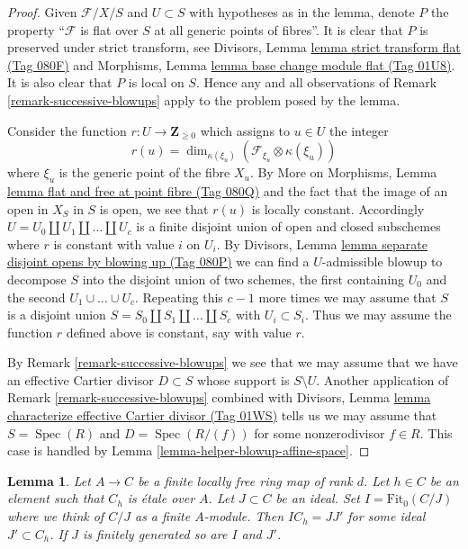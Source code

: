 \documentclass{amsart}
\theoremstyle{plain}
\newtheorem{lemma}[subsection]{Lemma}
\theoremstyle{definition}
\theoremstyle{remark}
\numberwithin{equation}{subsection}
\def\Spec{\mathop{\mathrm{Spec}}}
\begin{document}
\begin{proof}
Given $\mathcal{F}/X/S$ and $U \subset S$ with hypotheses as
in the lemma, denote $P$ the property ``$\mathcal{F}$ is flat over $S$ at
all generic points of fibres''. It is clear that $P$ is preserved under
strict transform, see
Divisors, Lemma \href{https://stacks.math.columbia.edu/tag/080F}{lemma strict transform flat (Tag 080F)}
and Morphisms, Lemma \href{https://stacks.math.columbia.edu/tag/01U8}{lemma base change module flat (Tag 01U8)}.
It is also clear that $P$ is local on $S$. Hence any and all observations
of Remark \ref{remark-successive-blowups} apply to the problem posed by
the lemma.

\medskip\noindent
Consider the function $r : U \to \mathbf{Z}_{\geq 0}$ which assigns to
$u \in U$ the integer
$$
r(u) = \dim_{\kappa(\xi_u)}(\mathcal{F}_{\xi_u} \otimes \kappa(\xi_u))
$$
where $\xi_u$ is the generic point of the fibre $X_u$.
By More on Morphisms, Lemma
\href{https://stacks.math.columbia.edu/tag/080Q}{lemma flat and free at point fibre (Tag 080Q)}
and the fact that the image of an open in $X_S$ in $S$ is open,
we see that $r(u)$ is locally constant. Accordingly
$U = U_0 \amalg U_1 \amalg \ldots \amalg U_c$ is a finite disjoint
union of open and closed subschemes where $r$ is constant with value
$i$ on $U_i$. By
Divisors, Lemma \href{https://stacks.math.columbia.edu/tag/080P}{lemma separate disjoint opens by blowing up (Tag 080P)}
we can find a $U$-admissible blowup to decompose $S$ into
the disjoint union of two schemes, the first containing $U_0$ and
the second $U_1 \cup \ldots \cup U_c$. Repeating this $c - 1$
more times we may assume that $S$ is a disjoint union
$S = S_0 \amalg S_1 \amalg \ldots \amalg S_c$ with $U_i \subset S_i$.
Thus we may assume the function $r$ defined above is constant, say
with value $r$.

\medskip\noindent
By Remark \ref{remark-successive-blowups} we see that we may assume that
we have an effective Cartier divisor $D \subset S$ whose support is
$S \setminus U$. Another application of Remark \ref{remark-successive-blowups}
combined with
Divisors, Lemma \href{https://stacks.math.columbia.edu/tag/01WS}{lemma characterize effective Cartier divisor (Tag 01WS)}
tells us we may assume that
$S = \Spec(R)$ and $D = \Spec(R/(f))$ for some nonzerodivisor
$f \in R$. This case is handled by
Lemma \ref{lemma-helper-blowup-affine-space}.
\end{proof}


\begin{lemma}
\label{lemma-trick-fitting-ideal}
Let $A \to C$ be a finite locally free ring map of rank $d$.
Let $h \in C$ be an element such that $C_h$ is \'etale over $A$.
Let $J \subset C$ be an ideal. Set $I = \text{Fit}_0(C/J)$ where we
think of $C/J$ as a finite $A$-module. Then $IC_h = JJ'$ for some ideal
$J' \subset C_h$. If $J$ is finitely generated so are $I$ and $J'$.
\end{lemma}
\end{document}
